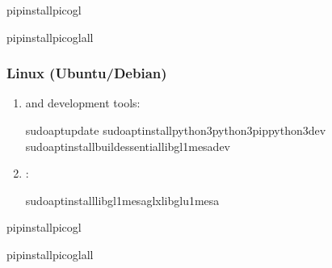 \documentclass[a4paper,10pt,english,openany,oneside]{sphinxmanual}
\begin{document}
\begin{sphinxVerbatim}[commandchars=\\\{\}]
pipinstallpicogl

pipinstallpicogl\PYG{o}{[}all\PYG{o}{]}
\end{sphinxVerbatim}


\subsubsection{Linux (Ubuntu/Debian)}
\label{\detokenize{installation:linux-ubuntu-debian}}\begin{enumerate}
%
\item {} 
\sphinxAtStartPar
{} and development tools:

\begin{sphinxVerbatim}[commandchars=\\\{\}]
sudoaptupdate
sudoaptinstallpython3python3\PYGZhy{}pippython3\PYGZhy{}dev
sudoaptinstallbuild\PYGZhy{}essentiallibgl1\PYGZhy{}mesa\PYGZhy{}dev
\end{sphinxVerbatim}

\item {} 
\sphinxAtStartPar
{}:

\begin{sphinxVerbatim}[commandchars=\\\{\}]
sudoaptinstalllibgl1\PYGZhy{}mesa\PYGZhy{}glxlibglu1\PYGZhy{}mesa
\end{sphinxVerbatim}

\end{enumerate}

\begin{sphinxVerbatim}[commandchars=\\\{\}]
pipinstallpicogl

pipinstallpicogl\PYG{o}{[}all\PYG{o}{]}
\end{sphinxVerbatim}
\end{document}
